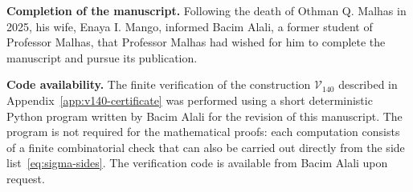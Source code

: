\documentclass{article}   	%
\theoremstyle{plain}
\theoremstyle{definition}
\theoremstyle{remark}
\begin{document}
\medskip

\noindent\textbf{Completion of the manuscript.}
Following the death of Othman Q. Malhas in 2025, his wife, Enaya I. Mango,
informed Bacim Alali, a former student of Professor Malhas, that Professor
Malhas had wished for him to complete the manuscript and pursue its publication.
\medskip

\noindent\textbf{Code availability.}
The finite verification of the construction $\mathcal V_{140}$ described
in Appendix~\ref{app:v140-certificate} was performed using a short
deterministic Python program written by Bacim Alali for the revision of
this manuscript. The program is not required for the mathematical proofs:
each computation consists of a finite combinatorial check that can also
be carried out directly from the side list~\eqref{eq:sigma-sides}.
The verification code is available from Bacim Alali upon request.


\end{document}
